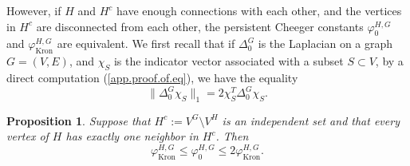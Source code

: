 \documentclass{article}
\newtheorem{proposition}{Proposition}[section]
\begin{document}
However,
if $H$ and $H^c$ have enough connections with each other,
and the vertices in $H^c$ are disconnected from each other,
the persistent Cheeger constants
$\varphi_0^{H, G}$ and $\varphi_{\operatorname{Kron}}^{H, G}$ are equivalent.
We first recall that if $\Delta_0^G$ is the Laplacian on a graph $G=(V, E)$,
and $\chi_S$ is the indicator vector associated with a subset $S\subset V$,
by a direct computation (\cref{app.proof.of.eq}),
we have the equality
\begin{equation}\label{eq:L_chi_1_norm}
\|\Delta_0^G\chi_S\|_1=2\chi_S^T\Delta_0^G\chi_S.
\end{equation}

\begin{proposition}\label{prop:kron_nonzero_cheeger_equiv}
Suppose that \(H^c:=V^G\setminus V^H\) is an independent set and that every vertex of \(H\) has exactly one neighbor in \(H^c\). Then
\[
\varphi_{\operatorname{Kron}}^{H,G}
\leq
\varphi_0^{H,G}
\leq
2\varphi_{\operatorname{Kron}}^{H,G}.
\]
\end{proposition}
\end{document}
